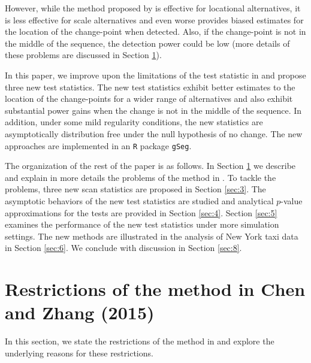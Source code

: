 \documentclass[arxiv, preprint]{imsart}
\numberwithin{equation}{section}
\theoremstyle{plain}
\begin{document}
However, while the method proposed by \cite{chen2015graph} is effective for locational alternatives, it is less effective for scale alternatives and even worse provides biased estimates for the location of the change-point when detected. Also, if the change-point is not in the middle of the sequence, the detection power could be low (more details of these problems are discussed in Section \ref{sec:2}). 

In this paper, we improve upon the limitations of the test statistic in \cite{chen2015graph} and propose three new test statistics. The new test statistics exhibit better estimates to the location of the change-points for a wider range of alternatives and also exhibit substantial power gains when the change is not in the middle of the sequence. In addition, under some mild regularity conditions, the new statistics are asymptotically distribution free under the null hypothesis of no change. The new approaches are implemented in an \texttt{R} package \texttt{gSeg}.

The organization of the rest of the paper is as follows. In Section \ref{sec:2} we describe and explain in more details the problems of the method in  \cite{chen2015graph}. To tackle the problems, three new scan statistics are proposed in Section \ref{sec:3}. The asymptotic behaviors of the new test statistics are studied and analytical $p$-value approximations for the tests are provided in Section \ref{sec:4}. Section \ref{sec:5}  examines the performance of the new test statistics under more simulation settings. The new methods are illustrated in the analysis of New York taxi data in Section \ref{sec:6}.  We conclude with discussion in Section \ref{sec:8}.


\section{Restrictions of the method in Chen and Zhang (2015)}
\label{sec:2}

In this section, we state the restrictions of the method in \cite{chen2015graph} and explore the underlying reasons for these restrictions. 

\end{document}

